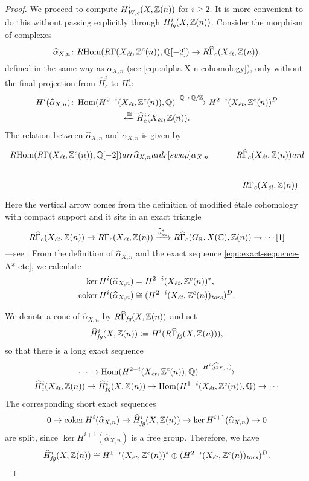 \documentclass[draft]{article}
\DeclareMathOperator{\coker}{coker}
\DeclareMathOperator{\Hom}{Hom}
\newcommand{\CC}{\mathbb{C}}
\newcommand{\QQ}{\mathbb{Q}}
\newcommand{\RR}{\mathbb{R}}
\newcommand{\ZZ}{\mathbb{Z}}
\newcommand{\ar}{\text{\it ar}}
\newcommand{\et}{\text{\it \'{e}t}}
\newcommand{\fg}{\text{\it fg}}
\newcommand{\tors}{\text{\it tors}}
\newcommand{\Wc}{\text{\it W,c}}
\newcommand{\dfn}{\mathrel{\mathop:}=}
\newcommand{\RHom}{R\!\Hom}
\theoremstyle{myplain}
\theoremstyle{mydefinition}
\begin{document}
\begin{proof}
  \vspace{1em}

  We proceed to compute $H^i_\Wc (X, \ZZ(n))$ for $i \ge 2$. It is more
  convenient to do this without passing explicitly through
  $H^i_\fg (X, \ZZ(n))$. Consider the morphism of complexes
  \[ \widehat{\alpha}_{X,n}\colon
    \RHom (R\Gamma (X_\et, \ZZ^c(n)), \QQ[-2]) \to
    R\widehat{\Gamma}_c (X_\et, \ZZ(n)), \]
  defined in the same way as $\alpha_{X,n}$
  (see \eqref{eqn:alpha-X-n-cohomology}), only without the final projection from
  $\widehat{H}^i_c$ to $H^i_c$:
  \begin{multline*}
    H^i (\widehat{\alpha}_{X,n})\colon \Hom (H^{2-i} (X_\et, \ZZ^c(n)), \QQ)
    \xrightarrow{\QQ \twoheadrightarrow \QQ/\ZZ}
    H^{2-i} (X_\et, \ZZ^c(n))^D \\
    \xleftarrow{\cong} \widehat{H}^i_c (X_\et, \ZZ(n)).
  \end{multline*}
  The relation between $\widehat{\alpha}_{X,n}$ and $\alpha_{X,n}$
  is given by
  \[ \begin{tikzcd}
      \RHom (R\Gamma (X_\et, \ZZ^c(n)), \QQ[-2]) \ar{r}{\widehat{\alpha}_{X,n}}\ar{dr}[swap]{\alpha_{X,n}} & R\widehat{\Gamma}_c (X_\et, \ZZ(n)) \ar{d} \\
      & R\Gamma_c (X_\et, \ZZ(n))
    \end{tikzcd} \]
  Here the vertical arrow comes from the definition of modified \'{e}tale
  cohomology with compact support and it sits in an exact triangle
  \[ R\widehat{\Gamma}_c (X_\et, \ZZ(n)) \to
    R\Gamma_c (X_\et, \ZZ(n)) \xrightarrow{\widehat{u}^*_\infty}
    R\widehat{\Gamma}_c (G_\RR, X(\CC), \ZZ(n)) \to \cdots [1] \]
  ---see \cite[Lemma~6.14]{Flach-Morin-2018}.
  From the definition of $\widehat{\alpha}_{X,n}$ and the exact sequence
  \eqref{eqn:exact-sequence-A*-etc}, we calculate
  \begin{align*}
    \ker H^i (\widehat{\alpha}_{X,n}) & = H^{2-i} (X_\et, \ZZ^c(n))^*, \\
    \coker H^i (\widehat{\alpha}_{X,n}) & \cong (H^{2-i} (X_\et, \ZZ^c (n))_\tors)^D.
  \end{align*}

  We denote a cone of $\widehat{\alpha}_{X,n}$ by
  $R\widehat{\Gamma}_\fg (X, \ZZ(n))$ and set
  $$\widehat{H}^i_\fg (X, \ZZ(n)) \dfn H^i (R\widehat{\Gamma}_\fg (X, \ZZ(n))),$$
  so that there is a long exact sequence
  \begin{multline*}
    \cdots \to \Hom (H^{2-i} (X_\et, \ZZ^c (n)), \QQ) \xrightarrow{H^i (\widehat{\alpha}_{X,n})} \\
    \widehat{H}^i_c (X_\et, \ZZ(n)) \to
    \widehat{H}^i_\fg (X, \ZZ(n)) \to
    \Hom (H^{1-i} (X_\et, \ZZ^c (n)), \QQ) \to \cdots
  \end{multline*}
  The corresponding short exact sequences
  \[ 0 \to \coker H^i (\widehat{\alpha}_{X,n}) \to
    \widehat{H}^i_\fg (X, \ZZ(n)) \to
    \ker H^{i+1} (\widehat{\alpha}_{X,n}) \to 0 \]
  are split, since $\ker H^{i+1} (\widehat{\alpha}_{X,n})$ is a free
  group. Therefore, we have
  \[ \widehat{H}^i_\fg (X, \ZZ(n)) \cong
    H^{1-i} (X_\et, \ZZ^c(n))^*
    \oplus
    (H^{2-i} (X_\et, \ZZ^c (n))_\tors)^D. \]


\end{proof}
\end{document}
